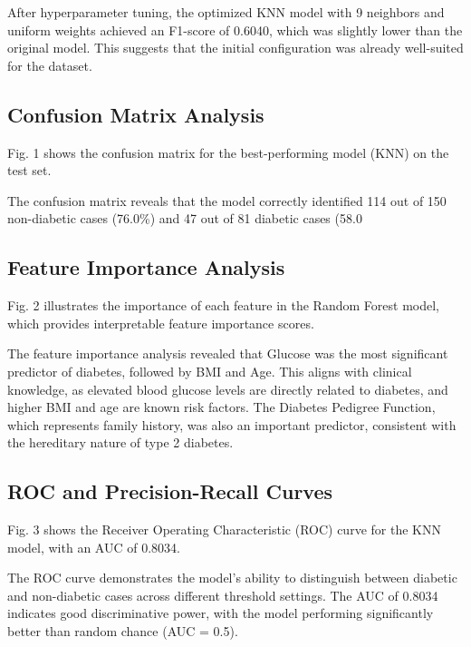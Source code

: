 \documentclass[conference]{IEEEtran}
\begin{document}
After hyperparameter tuning, the optimized KNN model with 9 neighbors and uniform weights achieved an F1-score of 0.6040, which was slightly lower than the original model. This suggests that the initial configuration was already well-suited for the dataset.

\subsection{Confusion Matrix Analysis}
Fig. 1 shows the confusion matrix for the best-performing model (KNN) on the test set.

The confusion matrix reveals that the model correctly identified 114 out of 150 non-diabetic cases (76.0\%) and 47 out of 81 diabetic cases (58.0%

\subsection{Feature Importance Analysis}
Fig. 2 illustrates the importance of each feature in the Random Forest model, which provides interpretable feature importance scores.

The feature importance analysis revealed that Glucose was the most significant predictor of diabetes, followed by BMI and Age. This aligns with clinical knowledge, as elevated blood glucose levels are directly related to diabetes, and higher BMI and age are known risk factors. The Diabetes Pedigree Function, which represents family history, was also an important predictor, consistent with the hereditary nature of type 2 diabetes.

\subsection{ROC and Precision-Recall Curves}
Fig. 3 shows the Receiver Operating Characteristic (ROC) curve for the KNN model, with an AUC of 0.8034.

The ROC curve demonstrates the model's ability to distinguish between diabetic and non-diabetic cases across different threshold settings. The AUC of 0.8034 indicates good discriminative power, with the model performing significantly better than random chance (AUC = 0.5).
\end{document}
